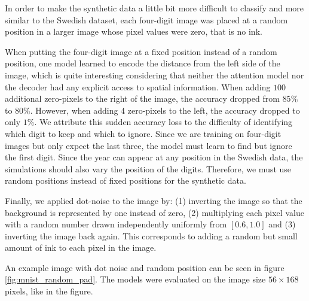 In order to make the synthetic data a little bit more difficult to classify and more similar to the Swedish dataset, each four-digit image was placed at a random position in a larger image whose pixel values were zero, that is no ink.

When putting the four-digit image at a fixed position instead of a random position, one model learned to encode the distance from the left side of the image, which is quite interesting considering that neither the attention model nor the decoder had any explicit access to spatial information.
When adding $100$ additional zero-pixels to the right of the image, the accuracy dropped from $85\%$ to $80\%$. However, when adding $4$ zero-pixels to the left, the accuracy dropped to only $1\%$. We attribute this sudden accuracy loss to the difficulty of identifying which digit to keep and which to ignore. Since we are training on four-digit images but only expect the last three, the model must learn to find but ignore the first digit.
Since the year can appear at any position in the Swedish data, the simulations should also vary the position of the digits. Therefore, we must use random positions instead of fixed positions for the synthetic data.

Finally, we applied dot-noise to the image by:
(1) inverting the image so that the background is represented by one instead of zero,
(2) multiplying each pixel value with a random number drawn independently uniformly from $[0.6, 1.0]$ and
(3) inverting the image back again.
This corresponds to adding a random but small amount of ink to each pixel in the image.

An example image with dot noise and random position can be seen in figure \ref{fig:mnist_random_pad}. The models were evaluated on the image size $56 \times 168$ pixels, like in the figure.




